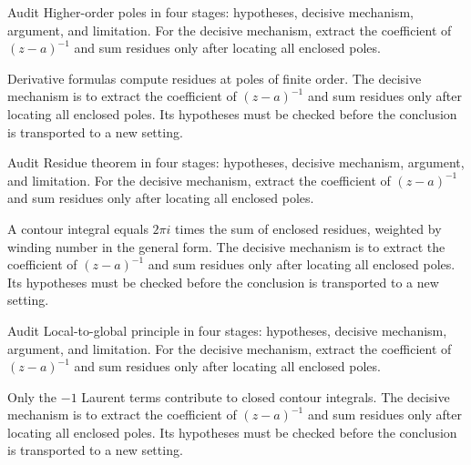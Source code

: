 \begin{problem}\label{prob:iv10-problem-03}
Audit Higher-order poles in four stages: hypotheses, decisive mechanism, argument, and limitation. For the decisive mechanism, extract the coefficient of \((z-a)^{-1}\) and sum residues only after locating all enclosed poles.
\end{problem}
\begin{solution}
Derivative formulas compute residues at poles of finite order. The decisive mechanism is to extract the coefficient of \((z-a)^{-1}\) and sum residues only after locating all enclosed poles. Its hypotheses must be checked before the conclusion is transported to a new setting.
\end{solution}

\begin{problem}\label{prob:iv10-problem-04}
Audit Residue theorem in four stages: hypotheses, decisive mechanism, argument, and limitation. For the decisive mechanism, extract the coefficient of \((z-a)^{-1}\) and sum residues only after locating all enclosed poles.
\end{problem}
\begin{solution}
A contour integral equals $2\pi i$ times the sum of enclosed residues, weighted by winding number in the general form. The decisive mechanism is to extract the coefficient of \((z-a)^{-1}\) and sum residues only after locating all enclosed poles. Its hypotheses must be checked before the conclusion is transported to a new setting.
\end{solution}

\begin{problem}\label{prob:iv10-problem-05}
Audit Local-to-global principle in four stages: hypotheses, decisive mechanism, argument, and limitation. For the decisive mechanism, extract the coefficient of \((z-a)^{-1}\) and sum residues only after locating all enclosed poles.
\end{problem}
\begin{solution}
Only the $-1$ Laurent terms contribute to closed contour integrals. The decisive mechanism is to extract the coefficient of \((z-a)^{-1}\) and sum residues only after locating all enclosed poles. Its hypotheses must be checked before the conclusion is transported to a new setting.
\end{solution}

